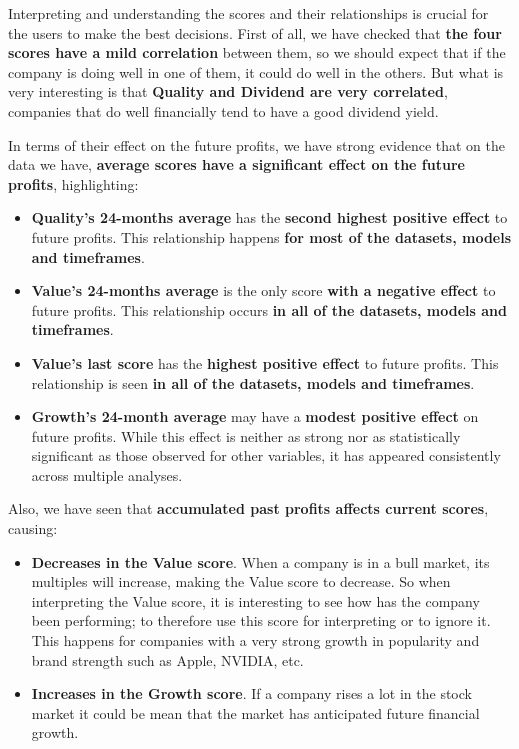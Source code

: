 \documentclass[11pt,english,a4paper,hidelinks]{book}
\begin{document}
\noindent Interpreting and understanding the scores and their relationships is crucial for the users to make the best decisions. First of all, we have checked that \textbf{the four scores have a mild correlation} between them, so we should expect that if the company is doing well in one of them, it could do well in the others. But what is very interesting is that \textbf{Quality and Dividend are very correlated}, companies that do well financially tend to have a good dividend yield.

\vspace{0.5cm}

\noindent In terms of their effect on the future profits, we have strong evidence that on the data we have, \textbf{average scores have a significant effect on the future profits}, highlighting:
\begin{itemize}
    \item \textbf{Quality's 24-months average} has the \textbf{second highest positive effect} to future profits. This relationship happens \textbf{for most of the datasets, models and timeframes}.
    \item \textbf{Value's 24-months average} is the only score \textbf{with a negative effect} to future profits. This relationship occurs \textbf{in all of the datasets, models and timeframes}.
    \item \textbf{Value's last score} has the \textbf{highest positive effect} to future profits. This relationship is seen \textbf{in all of the datasets, models and timeframes}.
    \item \textbf{Growth's 24-month average} may have a \textbf{modest positive effect} on future profits. While this effect is neither as strong nor as statistically significant as those observed for other variables, it has appeared consistently across multiple analyses.
\end{itemize}

\noindent Also, we have seen that \textbf{accumulated past profits affects current scores}, causing:
\begin{itemize}
    \item \textbf{Decreases in the Value score}. When a company is in a bull market, its multiples will increase, making the Value score to decrease. So when interpreting the Value score, it is interesting to see how has the company been performing; to therefore use this score for interpreting or to ignore it. This happens for companies with a very strong growth in popularity and brand strength such as Apple, NVIDIA, etc.
    \item \textbf{Increases in the Growth score}. If a company rises a lot in the stock market it could be mean that the market has anticipated future financial growth.
\end{itemize}
\end{document}
